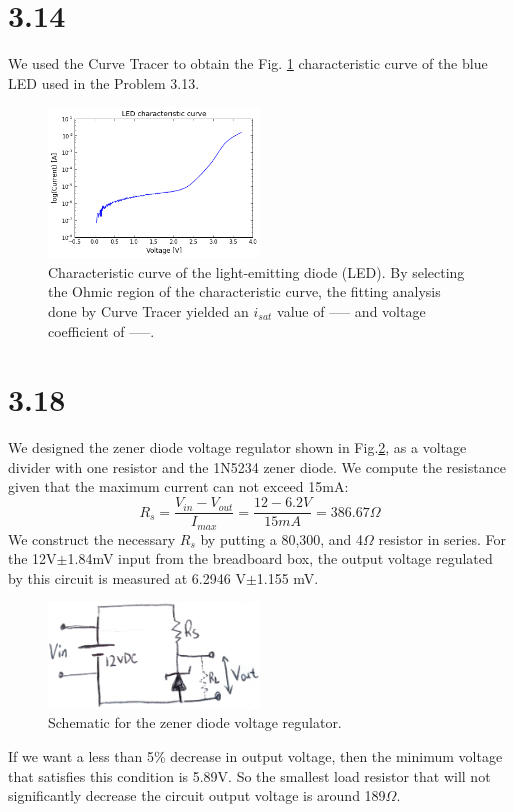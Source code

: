 \documentclass[authoryear, 12pt,5p, times]{elsarticle}
\begin{document}
\section*{3.14}
We used the Curve Tracer to obtain the Fig. \ref{3_14_LED} characteristic curve of the blue LED used in the Problem 3.13. 
\begin{figure}[h!]
\center
\includegraphics[width=0.5\textwidth]{figure/3_14_LED}
\caption{Characteristic curve of the light-emitting diode (LED). By selecting the Ohmic region of the characteristic curve, the fitting analysis done by Curve Tracer yielded an $i_{sat}$ value of ----- and voltage coefficient of -----. }
\label{3_14_LED}
\end{figure}
\section*{3.18}
We designed the zener diode voltage regulator shown in Fig.\ref{3_18_schematic}, as a voltage divider with one resistor and the 1N5234 zener diode. We compute the resistance given that the maximum current can not exceed 15mA:
\begin{equation}
R_s = \frac{V_{in}-V_{out}}{I_{max}}=\frac{12-6.2 V}{15mA} =386.67\Omega
\end{equation}
We construct the necessary $R_s$ by putting a 80,300, and 4$\Omega$ resistor in series. For the 12V$\pm$1.84mV input from the breadboard box, the output voltage regulated by this circuit is measured at 6.2946 V$\pm$1.155 mV.
\begin{figure}[h!]
\center
\includegraphics[width=0.5\textwidth]{figure/3_18_schematic}
\caption{Schematic for the zener diode voltage regulator.}
\label{3_18_schematic}
\end{figure}
If we want a less than 5\% decrease in output voltage, then the minimum voltage that satisfies this condition is 5.89V. So the smallest load resistor that will not significantly decrease the circuit output voltage is around 189$\Omega$. 
\end{document}
